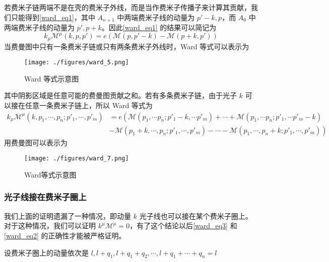 若费米子链两端不是在壳的费米子外线，而是当作费米子传播子来计算其贡献，我们只能得到\autoref{ward_eq1}，其中 $A_{n+1}$ 中两端费米子线的动量为 $p'-k,p$，而 $A_{0}$ 中两端费米子线的动量为 $p',p+k$。因此\autoref{ward_eq1} 的结果可以简记为
\begin{equation}\label{ward_eq3}
k_\mu\mathcal{M}^\mu(k,p,p') = e(\mathcal{M}(p,p'-k)-\mathcal{M}(p+k,p'))
\end{equation}
当费曼图中只有一条费米子链或只有两条费米子外线时，Ward 等式可以表示为
\begin{figure}[ht]
\centering
\texttt{[image: ./figures/ward\_5.png]}
\caption{Ward 等式示意图} \label{ward_fig5}
\end{figure}
其中阴影区域是任意可能的费曼图贡献之和。若有多条费米子链，由于光子 $k$ 可以接在任意一条费米子链上，所以 Ward 等式为
\begin{equation}\label{ward_eq2}
\begin{aligned}
k_\mu\mathcal{M}^\mu(k,p_1,\cdots,p_n;p'_1,\cdots,p'_m)
&= e\left(
\mathcal{M}(p_1,\cdots p_n;p'_1-k,\cdots p'_m)+\cdots+\mathcal{M}(p_1,\cdots p_n;p'_1,\cdots p'_m-k)
\right.
\\
&\left.-\mathcal{M}(p_1+k,\cdots,p_n;p'_1,\cdots,p'_m)-\cdots-\mathcal{M}(p_1,\cdots,p_n+k;p'_1,\cdots,p'_m)
\right)
\end{aligned}
\end{equation}
用费曼图可以表示为
\begin{figure}[ht]
\centering
\texttt{[image: ./figures/ward\_7.png]}
\caption{Ward等式示意图} \label{ward_fig7}
\end{figure}
\subsubsection{光子线接在费米子圈上}
我们上面的证明遗漏了一种情况，即动量 $k$ 光子线也可以接在某个费米子圈上。对于这种情况，我们可以证明 $k^\mu \mathcal{M}^\mu=0$，有了这个结论以后\autoref{ward_eq3} 和\autoref{ward_eq2} 的正确性才能被严格证明。

设费米子圈上的动量依次是 $l,l+q_1,l+q_1+q_2,\cdots,l+q_1+\cdots+q_n=l$
